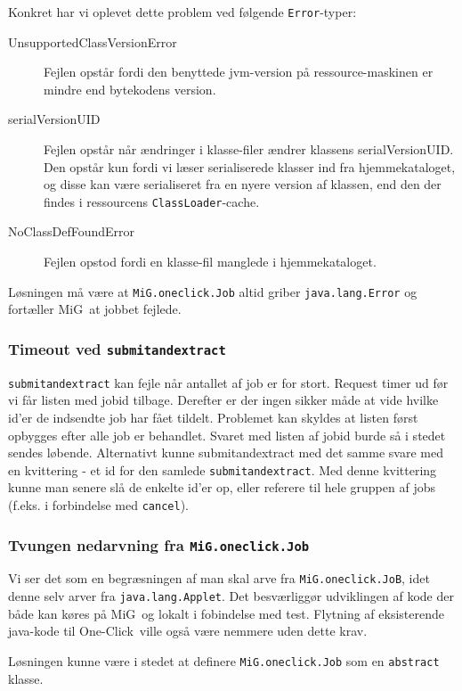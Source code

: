 \documentclass[draft,a4paper,11pt]{article}
\newcommand{\mig}{MiG}
\newcommand{\oc}{One-Click}
\begin{document}
Konkret har vi oplevet dette problem ved følgende \texttt{Error}-typer:
\begin{description}
	\item[UnsupportedClassVersionError]	Fejlen opstår fordi den benyttede jvm-version på ressource-maskinen er mindre end bytekodens version.
	\item[serialVersionUID]	Fejlen opstår når ændringer i klasse-filer ændrer klassens serialVersionUID. Den opstår kun fordi vi læser serialiserede klasser ind fra hjemmekataloget, og disse kan være serialiseret fra en nyere version af klassen, end den der findes i ressourcens \texttt{ClassLoader}-cache. 
	\item[NoClassDefFoundError]	Fejlen opstod fordi en klasse-fil manglede i hjemmekataloget.  
\end{description}

Løsningen må være at \texttt{MiG.oneclick.Job} altid griber \texttt{java.lang.Error} og fortæller \mig\ at jobbet fejlede.

\subsubsection*{Timeout ved \texttt{submitandextract}}
\texttt{submitandextract} kan fejle når antallet af job er for stort. Request timer ud før vi får listen med jobid tilbage. Derefter er der ingen sikker måde at vide hvilke id'er de indsendte job har fået tildelt. 
Problemet kan skyldes at listen først opbygges efter alle job er behandlet. Svaret med listen af jobid burde så i stedet sendes løbende. Alternativt kunne submitandextract med det samme svare med en kvittering - et id for den samlede \texttt{submitandextract}. Med denne kvittering kunne man senere slå de enkelte id'er op, eller referere til hele gruppen af jobs (f.eks. i forbindelse med \texttt{cancel}).

\subsubsection*{Tvungen nedarvning fra \texttt{MiG.oneclick.Job}}
Vi ser det som en begræsningen af man skal arve fra \texttt{MiG.oneclick.JoB}, idet denne selv arver fra \texttt{java.lang.Applet}. Det besværliggør udviklingen af kode der både kan køres på \mig\ og lokalt i fobindelse med test. Flytning af eksisterende java-kode til \oc\ ville også være nemmere uden dette krav.

Løsningen kunne være i stedet at definere \texttt{MiG.oneclick.Job} som en \texttt{abstract} klasse. 
\end{document}
